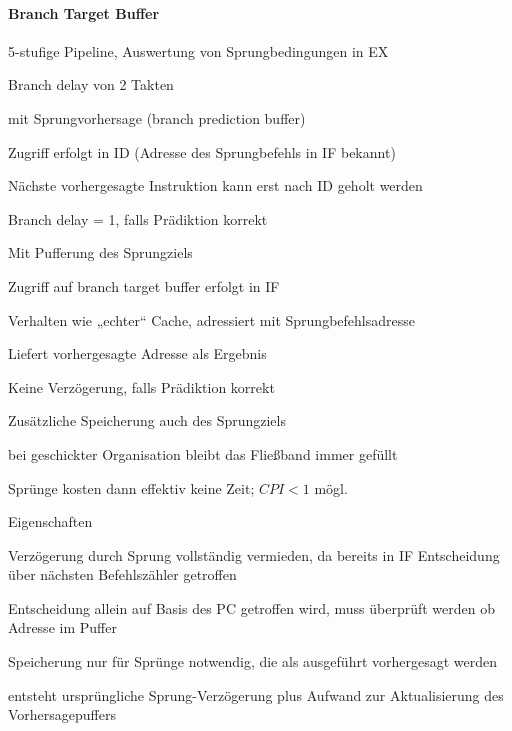 \documentclass[10pt,landscape]{article}
\begin{document}
\begin{multicols}{3}
  \paragraph{Branch Target Buffer}
  5-stufige Pipeline, Auswertung von Sprungbedingungen in EX
  \begin{itemize*}
    \item Branch delay von 2 Takten
    \item mit Sprungvorhersage (branch prediction buffer)
    \item Zugriff erfolgt in ID (Adresse des Sprungbefehls in IF bekannt)
    \item Nächste vorhergesagte Instruktion kann erst nach ID geholt werden
    \item Branch delay = 1, falls Prädiktion korrekt
    \item Mit Pufferung des Sprungziels
    \item Zugriff auf branch target buffer erfolgt in IF
    \item Verhalten wie „echter“ Cache, adressiert mit Sprungbefehlsadresse
    \item Liefert vorhergesagte Adresse als Ergebnis
    \item Keine Verzögerung, falls Prädiktion korrekt
    \item Zusätzliche Speicherung auch des Sprungziels
    \item bei geschickter Organisation bleibt das Fließband immer gefüllt
    \item Sprünge kosten dann effektiv keine Zeit; $CPI <1$ mögl.
  \end{itemize*}
  Eigenschaften
  \begin{itemize*}
    \item Verzögerung durch Sprung vollständig vermieden, da bereits in IF Entscheidung über nächsten Befehlszähler getroffen
    \item Entscheidung allein auf Basis des PC getroffen wird, muss überprüft werden ob Adresse im Puffer
    \item Speicherung nur für Sprünge notwendig, die als ausgeführt vorhergesagt werden
    \item entsteht ursprüngliche Sprung-Verzögerung plus Aufwand zur Aktualisierung des Vorhersagepuffers
  \end{itemize*}
  

\end{multicols}
\end{document}
